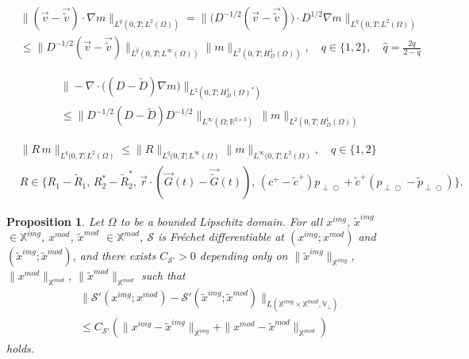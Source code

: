\documentclass[10pt,a4paper]{amsart}
\newtheorem{proposition}{Proposition}
\def\pp{p_{\perp\!\!\!\!\!\bigcirc}}
\def\pptil{\tilde{p}_{\perp\!\!\!\!\!\bigcirc}}
\newcommand{\skipsimple}[1]{}
\begin{document}
\begin{equation}\label{estv}
\begin{aligned}
&\|({\vec v}-\vec{\tilde{v}})\cdot\nabla m\|_{L^q(0,T;L^2(\Omega))}
=\|\bigl(D^{-1/2}({\vec v}-\vec{\tilde{v}})\bigr)\cdot  D^{1/2}\nabla m\|_{L^q(0,T;L^2(\Omega))}\\
&\leq \|D^{-1/2}({\vec v}-\vec{\tilde{v}})\|_{L^{\hat{q}}(0,T;L^\infty(\Omega))} \|m\|_{L^2(0,T;H_D^1(\Omega))}, \quad q\in\{1,2\}, \quad\hat{q}= \frac{2q}{2-q}
\end{aligned}
\end{equation}

\begin{equation*}%
\begin{aligned}
&\|-\nabla\cdot\bigl((D-\tilde{D})\nabla m\bigr)\|_{L^2(0,T;H_D^1(\Omega)^*)}\\
&\skipsimple{
=\Bigl(\int_0^T\Bigl(\sup_{w\in C_c^\infty(\Omega)\setminus\{0\}} \frac{1}{\|w\|_{H_D^1(\Omega)}}
\int_\Omega (D^{-1/2}(D-\tilde{D})D^{-1/2}\, D^{1/2}\nabla m) \cdot D^{-1/2}\nabla w\, d{\vec r}\Bigr)^2 \, dt\Bigr)^{1/2}
}
\leq \|D^{-1/2}(D-\tilde{D})D^{-1/2}\|_{L^\infty(\Omega;\mathbb{R}^{3\times 3})}\, \|m\|_{L^2(0,T;H_D^1(\Omega))}
\end{aligned}
\end{equation*}

\begin{equation}\label{estR}
\begin{aligned}
&\|R\,m\|_{L^q(0,T;L^2(\Omega)}\leq \|R\|_{L^q(0,T;L^\infty(\Omega)}\|m\|_{L^\infty(0,T;L^2(\Omega)}, \quad q\in\{1,2\}\\ 
&R\in\{R_1-\tilde{R}_1,\,R_2^*-\tilde{R}_2^*,\,\vec r \cdot (\vec G(t)-\vec{\tilde{G}}(t)),\,(c^+-\tilde{c}^+)\pp+\tilde{c}^+(\pp-\pptil)\}. 
\end{aligned}
\end{equation}

\begin{proposition}\label{prop:perturb_gen_deriv}
Let $\Omega$ to be a bounded Lipschitz domain.
For all ${x}^{img}$, $\tilde{x}^{img}$ $\in\mathbb{X}^{img}$, ${x}^{mod}$, $\tilde{x}^{mod}$ $\in\mathbb{X}^{mod}$, $\mathcal{S}$ is Fr\'{e}chet differentiable at $(x^{img};x^{mod})$ and $(\tilde{x}^{img};\tilde{x}^{mod})$, and there exists $C_{\mathcal{S}'}>0$ depending only on $\|\tilde{x}^{img}\|_{\mathbb{X}^{img}}$, $\|{x}^{mod}\|_{\mathbb{X}^{mod}}$, $\|\tilde{x}^{mod}\|_{\mathbb{X}^{mod}}$ such that 
\[
\begin{aligned}
&\|\mathcal{S}'(x^{img};x^{mod})-\mathcal{S}'(\tilde{x}^{img};\tilde{x}^{mod})\|_{L(\mathbb{X}^{img}\times\mathbb{X}^{mod},\mathbb{V}_\perp)}\\
&\leq C_{\mathcal{S}'}(\|x^{img}-\tilde{x}^{img}\|_{\mathbb{X}^{img}}+\|x^{mod}-\tilde{x}^{mod}\|_{\mathbb{X}^{mod}})
\end{aligned}
\]
holds.
\end{proposition}
\end{document}
